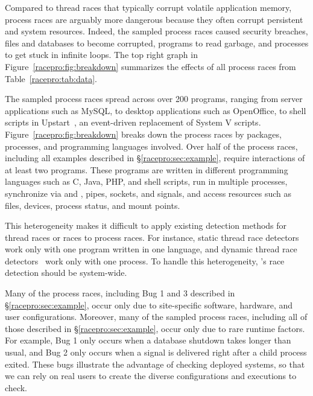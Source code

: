   Compared to thread races that
typically corrupt volatile application memory, process races
are arguably more dangerous because they often corrupt persistent and system resources.
Indeed, the sampled process races caused security breaches, files and databases to
become corrupted, programs to read garbage, and processes to get stuck
in infinite loops. The top right graph in Figure~\ref{racepro:fig:breakdown} summarizes the effects of
all process races from Table~\ref{racepro:tab:data}.

  The sampled process races
spread across over 200 programs, ranging from server
applications such as MySQL, to desktop applications such as OpenOffice,
to shell scripts in Upstart~\cite{upstart}, an event-driven
replacement of System V  scripts.  Figure~\ref{racepro:fig:breakdown}
breaks down the process races by packages, processes, and
programming languages involved.  Over half of the \nprace process races,
including all examples described in \S\ref{racepro:sec:example}, require 
interactions of at least two programs.  These programs are written in
different programming languages such as C, Java, PHP, and shell scripts,
run in multiple processes, synchronize via  and ,
pipes, sockets, and signals, and access resources such as files, devices,
process status, and mount points.

This heterogeneity makes it difficult to apply existing detection methods
for thread races or \toctou races to process races.  For instance, static thread
race detectors~\cite{racerx:sosp03} work only with one program
written in one language, and dynamic thread race
detectors~\cite{yu:racetrack:sosp} work only with one process.  To
handle this heterogeneity, \racepro's race detection should be
system-wide. 

 Many of the process races,
including Bug 1 and 3 described in
\S\ref{racepro:sec:example}, occur only due to site-specific software,
hardware, and user configurations.  Moreover, many of the sampled
process races, including all of those described in
\S\ref{racepro:sec:example}, occur only due to rare runtime factors. For
example, Bug 1 only occurs when a database shutdown takes longer 
than usual, and Bug 2 only occurs when a signal is delivered right 
after a child process exited.
These bugs illustrate the advantage of checking deployed systems, so that
we can rely on real users to create the diverse configurations and
executions to check.

